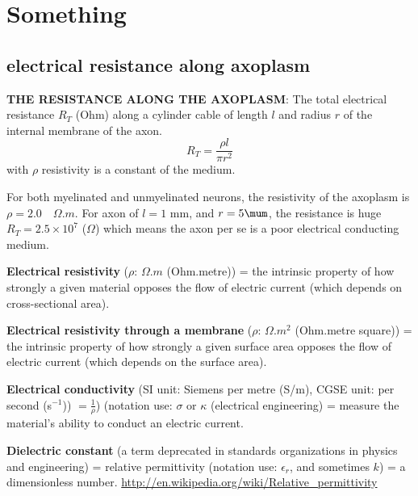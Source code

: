 \section{Something}
\subsection{electrical resistance along axoplasm}
\label{sec:electrical-resistance-unmyelinated}

{\bf THE RESISTANCE ALONG THE AXOPLASM}: The total electrical resistance $R_T$
(Ohm) along a cylinder cable of length $l$ and radius $r$ of the internal
membrane of the axon.
\begin{equation}
R_T = \frac{\rho l}{\pi r^2}
\end{equation}
with $\rho$ resistivity is a constant of the medium.
% 

For both myelinated and unmyelinated neurons, the resistivity of the axoplasm is
$\rho = 2.0 \quad \Omega.m$. For axon of $l=1$ mm, and $r = 5\mum$, the
resistance is huge $R_T=2.5\times 10^7$ ($\Omega$) which means the axon per se
is a poor electrical conducting medium.


  

\begin{mdframed}
{\bf Electrical resistivity} ($\rho$: $\Omega.m$ (Ohm.metre)) = the intrinsic
property of how strongly a given material opposes the flow of electric current (which
depends on cross-sectional area).

{\bf Electrical resistivity through a membrane} ($\rho$: $\Omega.m^2$
(Ohm.metre square)) = the intrinsic property of how strongly a given surface area opposes
the flow of electric current (which depends on the surface area).

{\bf Electrical conductivity} (SI unit: Siemens per metre (S/m), CGSE unit: per
second (s$^{-1}$)) $ = \frac{1}{\rho}$) (notation use: $\sigma$ or $\kappa$
(electrical engineering) = measure the material's ability to conduct an electric current.

{\bf Dielectric constant} (a term deprecated in standards organizations in
physics and engineering) = relative permittivity (notation use: $\epsilon_r$, and
sometimes $k$) = a dimensionless number.
\url{http://en.wikipedia.org/wiki/Relative_permittivity}
\end{mdframed}

